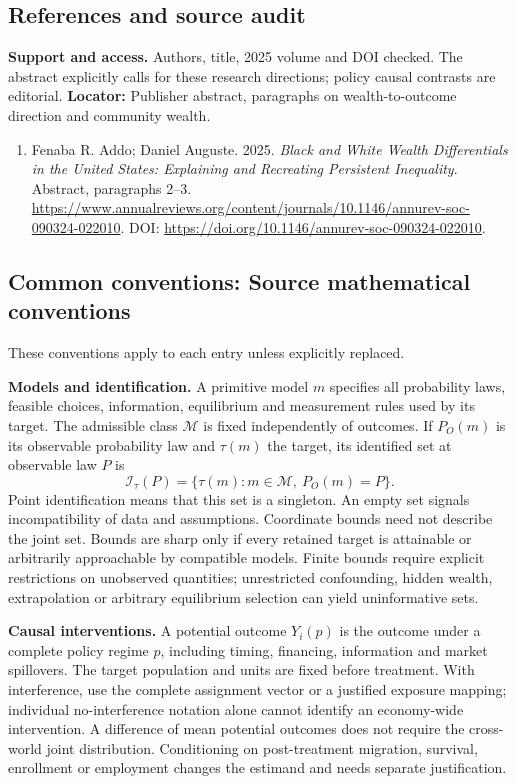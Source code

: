 \documentclass[11pt,a4paper]{article}
\begin{document}
\subsection*{References and source audit}
\textbf{Support and access.} Authors, title, 2025 volume and DOI checked. The abstract explicitly calls for these research directions; policy causal contrasts are editorial. \textbf{Locator:} Publisher abstract, paragraphs on wealth-to-outcome direction and community wealth.
\begin{enumerate}\raggedright
\item\hypertarget{definitions:source:30007647:1}{} Fenaba R. Addo; Daniel Auguste. 2025. \emph{Black and White Wealth Differentials in the United States: Explaining and Recreating Persistent Inequality}. Abstract, paragraphs 2–3.
\url{https://www.annualreviews.org/content/journals/10.1146/annurev-soc-090324-022010}.
DOI: \url{https://doi.org/10.1146/annurev-soc-090324-022010}.
\end{enumerate}

\subsection*{Common conventions: Source mathematical conventions}

These conventions apply to each entry unless explicitly replaced.

\textbf{Models and identification.} A primitive model \(m\) specifies all probability laws, feasible choices, information, equilibrium and measurement rules used by its target. The admissible class \(\mathcal M\) is fixed independently of outcomes. If \(P_O(m)\) is its observable probability law and \(\tau(m)\) the target, its identified set at observable law \(P\) is
\[
 \mathcal I_\tau(P)=\{\tau(m):m\in\mathcal M,\ P_O(m)=P\}.
\]
Point identification means that this set is a singleton. An empty set signals incompatibility of data and assumptions. Coordinate bounds need not describe the joint set. Bounds are sharp only if every retained target is attainable or arbitrarily approachable by compatible models. Finite bounds require explicit restrictions on unobserved quantities; unrestricted confounding, hidden wealth, extrapolation or arbitrary equilibrium selection can yield uninformative sets.

\textbf{Causal interventions.} A potential outcome \(Y_i(p)\) is the outcome under a complete policy regime \(p\), including timing, financing, information and market spillovers. The target population and units are fixed before treatment. With interference, use the complete assignment vector or a justified exposure mapping; individual no-interference notation alone cannot identify an economy-wide intervention. A difference of mean potential outcomes does not require the cross-world joint distribution. Conditioning on post-treatment migration, survival, enrollment or employment changes the estimand and needs separate justification.
\end{document}
